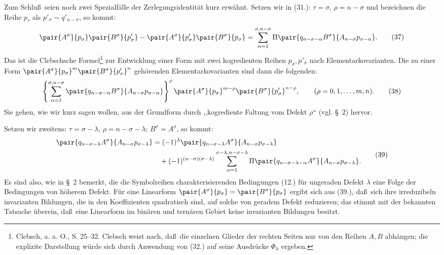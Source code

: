 Zum Schlu\ss\ seien noch zwei Spezialf\"alle der Zerlegungsidentit\"at kurz erw\"ahnt. Setzen wir in (31.): $\tau=\sigma$, $\rho=n-\sigma$ und bezeichnen die Reihe $p_\tau$ als $p'_\sigma\sim q'_{n-\sigma}$, so kommt:
\begin{equation}
\begin{aligned}
\pair{A^\sigma}{p_\sigma}\pair{B^\sigma}{p'_\sigma}
-\pair{A^\sigma}{p'_\sigma}\pair{B^\sigma}{p_\sigma}
=\sum_{\alpha=1}^{\sigma,n-\sigma}
\Pi\pair{q_{n-\sigma-\alpha}B^\sigma}{A_{n-\sigma}p_{\sigma-\alpha}}.
\end{aligned}
\tag{37}
\end{equation}
Das ist die Clebschsche Formel\footnote{Clebsch, a. a. O., S. 25--32. Clebsch weist nach, da\ss\ die einzelnen Glieder der rechten Seiten nur von den Reihen $A,B$ abh\"angen; die explizite Darstellung w\"urde sich durch Anwendung von (32.) auf seine Ausdr\"ucke $\Phi_h$ ergeben.} zur Entwicklung einer Form mit zwei kogredienten Reihen $p_\sigma,p'_\sigma$ nach Elementarkovarianten. Die zu einer Form $\pair{A^\sigma}{p_\sigma}^m\pair{B^\sigma}{p'_\sigma}^n$ geh\"orenden Elementarkovarianten sind dann die folgenden:
\begin{equation}
 \left\{\sum_{\alpha=1}^{\sigma,n-\sigma}
 \pair{q_{n-\sigma-\alpha}B^\sigma}{A_{n-\sigma}p_{\sigma-\alpha}}
 \right\}^{\rho}
 \pair{A^\sigma}{p_\sigma}^{m-\rho}\pair{B^\sigma}{p'_\sigma}^{n-\rho},
 \qquad (\rho=0,1,\ldots,m,n).
\tag{38}
\end{equation}
Sie gehen, wie wir kurz sagen wollen, aus der Grundform durch ,,kogrediente Faltung vom Defekt $\rho$`` (vgl. \S\ 2) hervor.

Setzen wir zweitens: $\tau=\sigma-\lambda$, $\rho=n-\sigma-\lambda$; $B^\sigma=A^\sigma$, so kommt:
\begin{equation}
\begin{aligned}
\pair{q_{n-\sigma-\lambda}A^\sigma}{A_{n-\sigma}p_{\sigma-\lambda}}
&=(-1)^\lambda\pair{q_{n-\sigma-\lambda}A^\sigma}{A_{n-\sigma}p_{\sigma-\lambda}}\\
&\quad+(-1)^{(n-\sigma)(\sigma-\lambda)}
 \sum_{\alpha=1}^{\sigma-\lambda,n-\sigma-\lambda}
 \Pi\pair{q_{n-\sigma-\lambda-\alpha}A^\sigma}{A_{n-\sigma}p_{\sigma-\lambda}}.
\end{aligned}
\tag{39}
\end{equation}
Es sind also, wie in \S\ 2 bemerkt, die die Symbolreihen charakterisierenden Bedingungen (12.) f\"ur ungeraden Defekt $\lambda$ eine Folge der Bedingungen von h\"oherem Defekt. F\"ur eine Linearform $\pair{A^\sigma}{p_\sigma}=\pair{B^\sigma}{p_\sigma}$ ergibt sich aus (39.), da\ss\ sich ihre irreduzibeln invarianten Bildungen, die in den Koeffizienten quadratisch sind, auf solche von geradem Defekt reduzieren; das stimmt mit der bekannten Tatsache \"uberein, da\ss\ eine Linearform im bin\"aren und tern\"aren Gebiet keine invarianten Bildungen besitzt.

